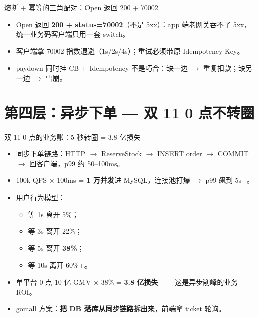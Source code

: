 \documentclass[aspectratio=169,11pt]{beamer}
\begin{document}
\begin{frame}[shrink]{熔断 + 幂等的三角配对：Open 返回 200 + 70002}
\vspace{1mm}
\begin{itemize}
  \item Open 返回 \textbf{200 + status=70002}（不是 5xx）：app 端老网关吞不了 5xx，统一业务码客户端只用一套 switch。
  \item 客户端拿 70002 指数退避（1s/2s/4s）；重试必须带原 Idempotency-Key。
  \item paydown 同时挂 CB + Idempotency 不是巧合：缺一边 $\to$ 重复扣款；缺另一边 $\to$ 雪崩。
\end{itemize}
\end{frame}

\section{第四层：异步下单 — 双 11 0 点不转圈}

\begin{frame}[shrink]{双 11 0 点的业务账：5 秒转圈 = 3.8 亿损失}
\begin{itemize}
  \item 同步下单链路：HTTP $\to$ ReserveStock $\to$ INSERT order $\to$ COMMIT $\to$ 回客户端，p99 约 50--100ms。
  \item 100k QPS $\times$ 100ms = \textbf{1 万并发}进 MySQL，连接池打爆 $\to$ p99 飙到 5s+。
  \item 用户行为模型：
  \begin{itemize}
    \item 等 1s 离开 5\%；
    \item 等 3s 离开 22\%；
    \item 等 5s 离开 \textbf{38\%}；
    \item 等 10s 离开 60\%+。
  \end{itemize}
  \item 单平台 0 点 10 亿 GMV $\times$ 38\% = \textbf{3.8 亿损失}—— 这是异步削峰的业务 ROI。
  \item gomall 方案：\textbf{把 DB 落库从同步链路拆出来}，前端拿 ticket 轮询。
\end{itemize}
\end{frame}
\end{document}
